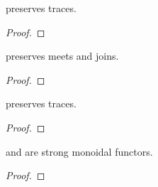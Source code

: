 \begin{lemma}
    \FixFunMinRes preserves traces.
\end{lemma}
\begin{proof}
\end{proof}

\begin{lemma}
    \FixResMaxFun preserves meets and joins.
\end{lemma}
\begin{proof}
\end{proof}

\begin{lemma}
    \FixResMaxFun preserves traces.
\end{lemma}
\begin{proof}
\end{proof}

\begin{lemma}
    \FixFunMinRes and \FixResMaxFun are strong monoidal functors.
\end{lemma}

\begin{proof}
\end{proof}